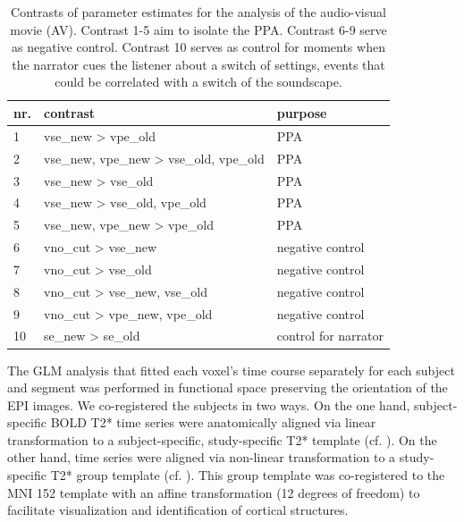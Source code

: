 \documentclass[english]{article}
\begin{document}
\begin{table}[h!]
    \caption{Contrasts of parameter estimates for the analysis of the audio-visual movie (AV).
Contrast 1-5 aim to isolate the PPA.
    Contrast 6-9 serve as negative control.
    Contrast 10 serves as control for moments when the narrator cues the
    listener about a switch of settings, events that could be correlated with a
    switch of the soundscape.}
\label{tab:av-contrasts}
\footnotesize
\begin{tabular}{lll}
\toprule
\textbf{nr.} &  \textbf{contrast} & \textbf{purpose} \\
\midrule
1 & vse\_new > vpe\_old & PPA \tabularnewline
2 & vse\_new, vpe\_new > vse\_old, vpe\_old & PPA \tabularnewline
3 & vse\_new > vse\_old & PPA \tabularnewline
4 & vse\_new > vse\_old, vpe\_old & PPA \tabularnewline
5 & vse\_new, vpe\_new > vpe\_old & PPA \tabularnewline
6 & vno\_cut > vse\_new & negative control \tabularnewline
7 & vno\_cut > vse\_old & negative control \tabularnewline
8 & vno\_cut > vse\_new, vse\_old & negative control \tabularnewline
9 & vno\_cut > vpe\_new, vpe\_old & negative control \tabularnewline
10 & se\_new > se\_old & control for narrator \tabularnewline
\end{tabular}
\end{table}

The GLM analysis that fitted each voxel's time course separately for each
subject and segment was performed in functional space preserving the orientation
of the EPI images.
We co-registered the subjects in two ways.
On the one hand, subject-specific BOLD T2* time series were anatomically aligned
via linear transformation to a subject-specific, study-specific T2* template
(cf. \citep{sengupta2016extension}).
On the other hand, time series were aligned via non-linear transformation to a
study-specific T2* group template (cf. \citep{hanke2014audiomovie}).
This group template was co-registered to the MNI 152 template with an affine
transformation (12 degrees of freedom) to facilitate visualization and
identification of cortical structures.
\end{document}
